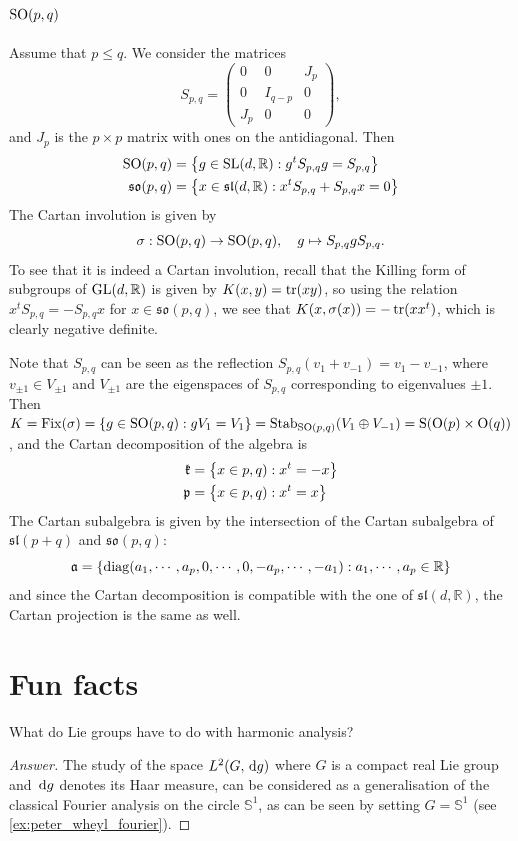 \documentclass{report}
\begin{document}
\section{$\operatorname{{\mathrm{SO}}}(p,q)$}
Assume that $p \leq q$.
We consider the matrices
\[
S_{p,q} = \begin{pmatrix} 
    0 & 0 & J_p \\ 
    0 & I_{q-p} & 0\\
    J_p & 0 & 0
\end{pmatrix},
\]
and $J_p$ is the $p \times p$ matrix with ones on the antidiagonal.
Then
\begin{align*}
    \operatorname{{\mathrm{SO}}}(p,q) &= \left\{ g \in \operatorname{{\mathrm{SL}}}(d, \mathbb R) : g^t S_{p,q} g = S_{p,q} \right\}\\
    \mathfrak{so}(p,q) &= \left\{ x \in \mathfrak{sl}(d, \mathbb R) : x^t S_{p,q} + S_{p,q}x = 0 \right\}
\end{align*}
The Cartan involution is given by 
\[
\sigma: \operatorname{{\mathrm{SO}}}(p,q) \to \operatorname{{\mathrm{SO}}}(p,q), \quad g \mapsto S_{p,q} g S_{p,q}.
\]
To see that it is indeed a Cartan involution, recall that the Killing form of subgroups of $\operatorname{{\mathrm{GL}}}(d, \mathbb R)$ is given by $K(x,y) = \operatorname{tr}(xy)$, so using the relation $x^t S_{p,q} = - S_{p,q}x$ for $x \in \mathfrak{so}(p,q)$, we see that $K(x, \sigma(x)) = - \operatorname{tr}(x x^t)$, which is clearly negative definite.

Note that $S_{p,q}$ can be seen as the reflection $S_{p,q}(v_1 + v_{-1}) = v_1 - v_{-1}$, where $v_{\pm 1} \in V_{\pm 1}$ and $V_{\pm 1}$ are the eigenspaces of $S_{p,q}$ corresponding to eigenvalues $\pm 1$.
Then $K = \mathrm{Fix}(\sigma) = \left\{ g \in \operatorname{{\mathrm{SO}}}(p,q) : g V_1 = V_1 \right\} = \mathrm{Stab}_{\operatorname{{\mathrm{SO}}}(p,q)}(V_1 \oplus V_{-1}) = \mathrm{S}(\mathrm{O}(p) \times \mathrm{O}(q))$, and the Cartan decomposition of the algebra is
\begin{align*}
    \mathfrak{k} &= \left\{ x \in \so(p,q) : x^t = -x \right\}\\
    \mathfrak{p} &= \left\{ x \in \so(p,q) : x^t = x \right\}\\
\end{align*}
The Cartan subalgebra is given by the intersection of the Cartan subalgebra of $\mathfrak{sl}(p+q)$ and $\mathfrak{so}(p,q)$:
\[
\mathfrak{a} = \left\{ \operatorname{diag}(a_1, \cdots, a_p, 0, \cdots, 0, -a_p, \cdots, -a_1) : a_1, \cdots, a_p \in \mathbb R  \right\}
\]
and since the Cartan decomposition is compatible with the one of $\mathfrak{sl}(d, \mathbb R)$, the Cartan projection is the same as well.
\chapter{Fun facts}

\begin{question}
    What do Lie groups have to do with harmonic analysis?
\end{question}
\begin{proof}[Answer]
    The study of the space $L^2(G, \,\mathrm{d} g)$ where $G$ is a compact real Lie group and $\,\mathrm{d} g$ denotes its Haar measure, can be considered as a generalisation of the classical Fourier analysis on the circle $\mathbb S^1$, as can be seen by setting $G = \mathbb S^1$ (see \cref{ex:peter_wheyl_fourier}).
\end{proof}


\printbibliography
\end{document}
